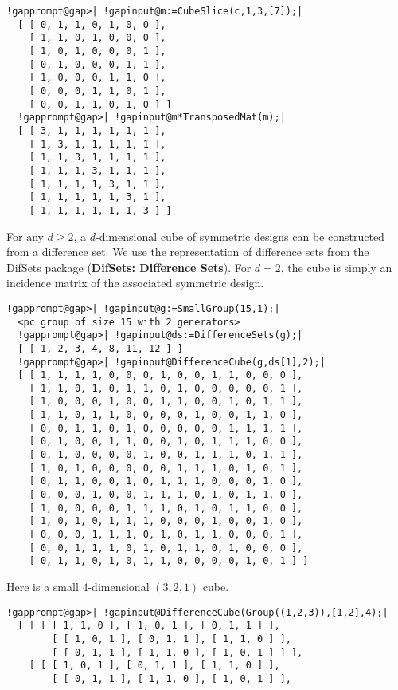 \documentclass[a4paper,11pt]{report}
\begin{document}
{{\begin{Verbatim}[commandchars=!@|,fontsize=\small,frame=single,label=Example]
  !gapprompt@gap>| !gapinput@m:=CubeSlice(c,1,3,[7]);|
  [ [ 0, 1, 1, 0, 1, 0, 0 ], 
    [ 1, 1, 0, 1, 0, 0, 0 ], 
    [ 1, 0, 1, 0, 0, 0, 1 ], 
    [ 0, 1, 0, 0, 0, 1, 1 ], 
    [ 1, 0, 0, 0, 1, 1, 0 ], 
    [ 0, 0, 0, 1, 1, 0, 1 ], 
    [ 0, 0, 1, 1, 0, 1, 0 ] ]
  !gapprompt@gap>| !gapinput@m*TransposedMat(m);|
  [ [ 3, 1, 1, 1, 1, 1, 1 ], 
    [ 1, 3, 1, 1, 1, 1, 1 ], 
    [ 1, 1, 3, 1, 1, 1, 1 ], 
    [ 1, 1, 1, 3, 1, 1, 1 ], 
    [ 1, 1, 1, 1, 3, 1, 1 ], 
    [ 1, 1, 1, 1, 1, 3, 1 ], 
    [ 1, 1, 1, 1, 1, 1, 3 ] ]
\end{Verbatim}
 For any $d\ge 2$, a $d$-dimensional cube of symmetric designs can be constructed from a difference
set. We use the representation of difference sets from the \textsf{DifSets} package  (\textbf{DifSets: Difference Sets}). For $d=2$, the cube is simply an incidence matrix of the associated symmetric design. 
\begin{Verbatim}[commandchars=!@|,fontsize=\small,frame=single,label=Example]
  !gapprompt@gap>| !gapinput@g:=SmallGroup(15,1);|
  <pc group of size 15 with 2 generators>
  !gapprompt@gap>| !gapinput@ds:=DifferenceSets(g);|
  [ [ 1, 2, 3, 4, 8, 11, 12 ] ]
  !gapprompt@gap>| !gapinput@DifferenceCube(g,ds[1],2);|
  [ [ 1, 1, 1, 1, 0, 0, 0, 1, 0, 0, 1, 1, 0, 0, 0 ], 
    [ 1, 1, 0, 1, 0, 1, 1, 0, 1, 0, 0, 0, 0, 0, 1 ], 
    [ 1, 0, 0, 0, 1, 0, 0, 1, 1, 0, 0, 1, 0, 1, 1 ], 
    [ 1, 1, 0, 1, 1, 0, 0, 0, 0, 1, 0, 0, 1, 1, 0 ], 
    [ 0, 0, 1, 1, 0, 1, 0, 0, 0, 0, 0, 1, 1, 1, 1 ], 
    [ 0, 1, 0, 0, 1, 1, 0, 0, 1, 0, 1, 1, 1, 0, 0 ], 
    [ 0, 1, 0, 0, 0, 0, 1, 0, 0, 1, 1, 1, 0, 1, 1 ], 
    [ 1, 0, 1, 0, 0, 0, 0, 0, 1, 1, 1, 0, 1, 0, 1 ], 
    [ 0, 1, 1, 0, 0, 1, 0, 1, 1, 1, 0, 0, 0, 1, 0 ], 
    [ 0, 0, 0, 1, 0, 0, 1, 1, 1, 0, 1, 0, 1, 1, 0 ], 
    [ 1, 0, 0, 0, 0, 1, 1, 1, 0, 1, 0, 1, 1, 0, 0 ], 
    [ 1, 0, 1, 0, 1, 1, 1, 0, 0, 0, 1, 0, 0, 1, 0 ], 
    [ 0, 0, 0, 1, 1, 1, 0, 1, 0, 1, 1, 0, 0, 0, 1 ], 
    [ 0, 0, 1, 1, 1, 0, 1, 0, 1, 1, 0, 1, 0, 0, 0 ], 
    [ 0, 1, 1, 0, 1, 0, 1, 1, 0, 0, 0, 0, 1, 0, 1 ] ]
\end{Verbatim}
 Here is a small $4$-dimensional $(3,2,1)$ cube. 
\begin{Verbatim}[commandchars=!@|,fontsize=\small,frame=single,label=Example]
  !gapprompt@gap>| !gapinput@DifferenceCube(Group((1,2,3)),[1,2],4);|
  [ [ [ [ 1, 1, 0 ], [ 1, 0, 1 ], [ 0, 1, 1 ] ], 
        [ [ 1, 0, 1 ], [ 0, 1, 1 ], [ 1, 1, 0 ] ], 
        [ [ 0, 1, 1 ], [ 1, 1, 0 ], [ 1, 0, 1 ] ] ], 
    [ [ [ 1, 0, 1 ], [ 0, 1, 1 ], [ 1, 1, 0 ] ], 
        [ [ 0, 1, 1 ], [ 1, 1, 0 ], [ 1, 0, 1 ] ], 

\end{Verbatim}}}
\end{document}

